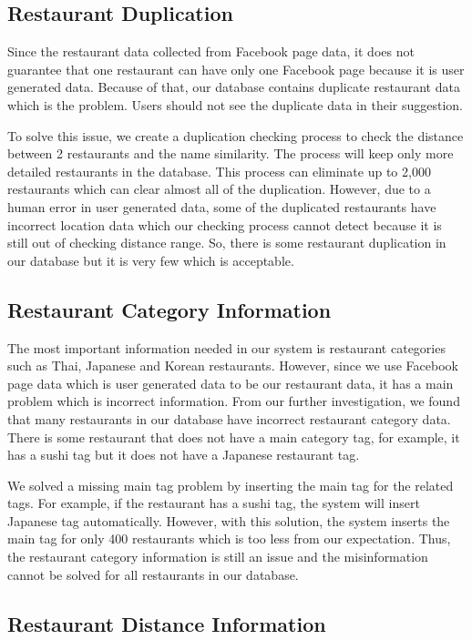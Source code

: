 \documentclass[12pt,oneside,openright,a4paper]{cpe-english-project}
\begin{document}
\subsection{Restaurant Duplication}
Since the restaurant data collected from Facebook page data, it does not guarantee that one restaurant can have only one Facebook page because it is user generated data. Because of that, our database contains duplicate restaurant data which is the problem. Users should not see the duplicate data in their suggestion.

To solve this issue, we create a duplication checking process to check the distance between 2 restaurants and the name similarity. The process will keep only more detailed restaurants in the database. This process can eliminate up to 2,000 restaurants which can clear almost all of the duplication. However, due to a human error in user generated data, some of the duplicated restaurants have incorrect location data which our checking process cannot detect because it is still out of checking distance range. So, there is some restaurant duplication in our database but it is very few which is acceptable.

\subsection{Restaurant Category Information}
The most important information needed in our system is restaurant categories such as Thai, Japanese and Korean restaurants. However, since we use Facebook page data which is user generated data to be our restaurant data, it has a main problem which is incorrect information. From our further investigation, we found that many restaurants in our database have incorrect restaurant category data. There is some restaurant that does not have a main category tag, for example, it has a sushi tag but it does not have a Japanese restaurant tag.

We solved a missing main tag problem by inserting the main tag for the related tags. For example, if the restaurant has a sushi tag, the system will insert Japanese tag automatically. However, with this solution, the system inserts the main tag for only 400 restaurants which is too less from our expectation. Thus, the restaurant category information is still an issue and the misinformation cannot be solved for all restaurants in our database.

\subsection{Restaurant Distance Information}
\end{document}
